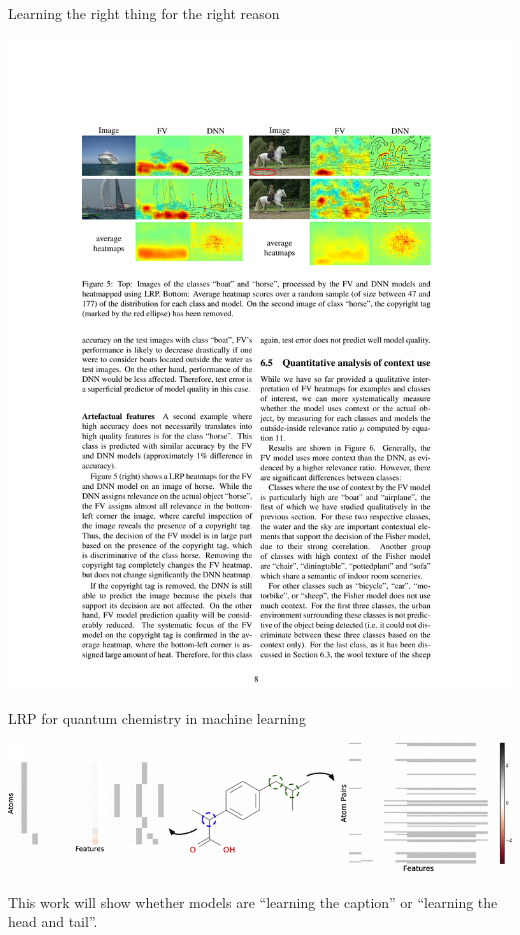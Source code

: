 \documentclass[xetex,compress]{beamer}
\begin{document}
\begin{frame}{Learning the right thing for the right reason}
  \begin{center}
    \includegraphics[width=1.00\textwidth]{./figures/fv_vs_dnn.pdf}
  \end{center}
\end{frame}

\begin{frame}{LRP for quantum chemistry in machine learning}
  \begin{center}
    \includegraphics[width=1.00\textwidth]{./figures/bad_featurization.png}
  \end{center}
  This work will show whether models are ``learning the caption'' or ``learning the head and tail''.
\end{frame}
\end{document}
